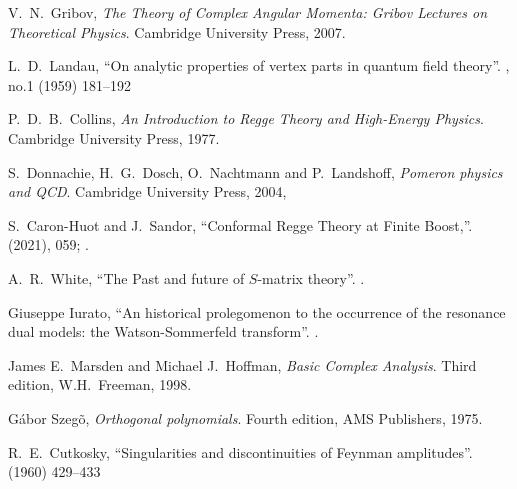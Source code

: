 \begin{thebibliography}{99}
V.~N.~Gribov,
\emph{The Theory of Complex Angular Momenta: Gribov Lectures on Theoretical Physics}.
Cambridge University Press, 2007.\newline
{\tt{}}

L.~D.~Landau,
``On analytic properties of vertex parts in quantum field theory''.
 , no.1 (1959) 181--192\newline
{\tt{}}

P.~D.~B.~Collins,
\textit{An Introduction to Regge Theory and High-Energy Physics}.
Cambridge University Press, 1977.\newline
{\tt{}}

S.~Donnachie, H.~G.~Dosch, O.~Nachtmann and P.~Landshoff,
\emph{Pomeron physics and QCD}.
Cambridge University Press, 2004,

S.~Caron-Huot and J.~Sandor,
``Conformal Regge Theory at Finite Boost,''.
  (2021), 059; .\newline
{\tt{}}

A.~R.~White,
``The Past and future of $S$-matrix theory''.
.

  Giuseppe Iurato,
  ``An historical prolegomenon to the occurrence of the resonance dual models: the Watson-Sommerfeld transform''.
  .
  
  James E.~Marsden and Michael J.~Hoffman,
  \emph{Basic Complex Analysis}.
  Third edition, W.H.~Freeman, 1998.

  G\'abor Szeg\~o,
  \emph{Orthogonal polynomials}.
  Fourth edition, AMS Publishers, 1975.


R.~E.~Cutkosky,
``Singularities and discontinuities of Feynman amplitudes''.
  (1960) 429--433\newline
{\tt{}}


\end{thebibliography}
